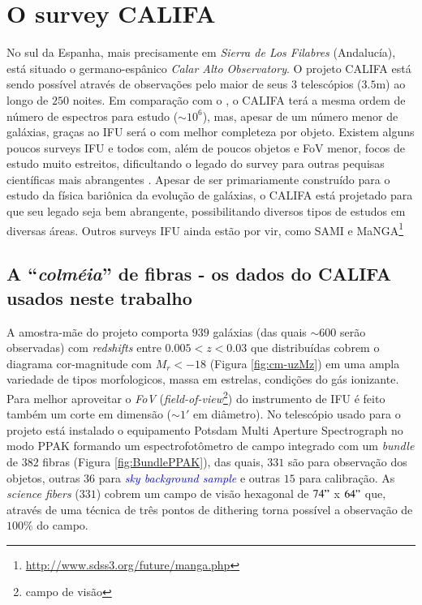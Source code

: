\section{O survey CALIFA}
\label{sec:CALePyC:Apresent}

No sul da Espanha, mais precisamente em {\em Sierra de Los Filabres}
(Andalucía), está situado o germano-espânico {\em Calar Alto Observatory}. O
projeto CALIFA está sendo possível através de observações pelo maior de seus $3$
telescópios ($3.5$m) ao longo de $250$ noites. Em comparação com o \SDSS, o
CALIFA terá a mesma ordem de número de espectros para estudo ($\sim10^6$), mas,
apesar de um número menor de galáxias, graças ao IFU será o com melhor
completeza por objeto. Existem alguns poucos surveys IFU e todos com, além de
poucos objetos e FoV menor, focos de estudo muito estreitos, dificultando o
legado do survey para outras pequisas científicas mais abrangentes
\citep[SAURON; ][região central de 72 galáxias com $z < 0.01$.]{de-Zeeuw2002}
\citep[PINGS; ][algumas galáxias muito próximas ($\sim 10$ Mpc) e o estudo atual
de 70 (U)LIRGs com $z <0.26$]{RosalesOrtega2010} \citep[VENGA; ][$30$ galáxias
espirais]{Blanc2010}. Apesar de ser primariamente construído para o estudo da
física bariônica da evolução de galáxias, o CALIFA está projetado para que seu
legado seja bem abrangente, possibilitando diversos tipos de estudos em diversas
áreas. Outros surveys IFU ainda estão por vir, como SAMI \citep{Croom2012} e
MaNGA\footnote{\url{http://www.sdss3.org/future/manga.php}}

\subsection{A ``{\em colméia}'' de fibras - os dados do CALIFA usados neste
trabalho}

A amostra-mãe do projeto comporta $939$ galáxias (das quais $\sim 600$ serão
observadas) com {\em redshifts} entre $0.005 < z < 0.03$ que distribuídas cobrem
o diagrama cor-magnitude com $M_r < -18$ (Figura \ref{fig:cm-uzMz}) em uma ampla
variedade de tipos morfologicos, massa em estrelas, condições do gás ionizante.
Para melhor aproveitar o {\em FoV} ({\em field-of-view}\footnote{campo de
visão}) do instrumento de IFU é feito também um corte em dimensão ($\sim1'$ em
diâmetro). No telescópio usado para o projeto está instalado o equipamento
Potsdam Multi Aperture Spectrograph \citep[PMAS; ][]{Roth2005} no modo PPAK
\citep{Verheijen2004, Kelz2006} formando um espectrofotômetro de campo integrado
com um {\em bundle} de $382$ fibras (Figura \ref{fig:BundlePPAK}), das quais,
$331$ são para observação dos objetos, outras $36$ para \ojo
\textcolor{blue}{\em sky background sample} e outras $15$ para calibração. As
{\em science fibers} ($331$) cobrem um campo de visão hexagonal de $74"$ x $64"$
que, através de uma técnica de três pontos de dithering \ojo torna possível a
observação de $100\%$ do campo.


